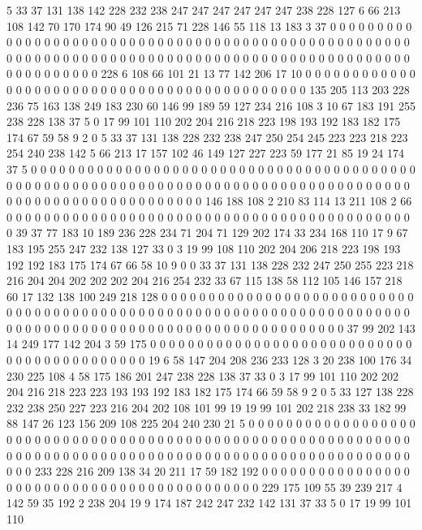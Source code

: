 5 33 37 131 138 142 228 232 238 247 247 247 247 247 247 238 228 127 6 66
213 108 142 70 170 174 90 49 126 215 71 228 146 55 118 13 183 3 37 0
0 0 0 0 0 0 0 0 0 0 0 0 0 0 0 0 0 0 0 0
0 0 0 0 0 0 0 0 0 0 0 0 0 0 0 0 0 0 0 0
0 0 0 0 0 0 0 0 0 0 0 0 0 0 0 0 0 0 0 0
0 0 0 0 0 0 0 0 0 0 0 0 0 0 0 0 0 0 0 0
0 0 0 0 0 0 0 0 0 0 0 0 0 0 0 0 0 0 0 0
0 0 0 0 228 6 108 66 101 21 13 77 142 206 17 10 0 0 0 0
0 0 0 0 0 0 0 0 0 0 0 0 0 0 0 0 0 0 0 0
0 0 0 0 0 0 0 0 0 0 0 0 0 0 0 0 0 0 0 0
135 205 113 203 228 236 75 163 138 249 183 230 60 146 99 189 59 127 234 216
108 3 10 67 183 191 255 238 228 138 37 5 0 17 99 101 110 202 204 216
218 223 198 193 192 183 182 175 174 67 59 58 9 2 0 5 33 37 131 138
228 232 238 247 250 254 245 223 223 218 223 254 240 238 142 5 66 213 17 157
102 46 149 127 227 223 59 177 21 85 19 24 174 37 5 0 0 0 0 0
0 0 0 0 0 0 0 0 0 0 0 0 0 0 0 0 0 0 0 0
0 0 0 0 0 0 0 0 0 0 0 0 0 0 0 0 0 0 0 0
0 0 0 0 0 0 0 0 0 0 0 0 0 0 0 0 0 0 0 0
0 0 0 0 0 0 0 0 0 0 0 0 0 0 0 0 0 0 0 0
0 0 0 0 0 0 0 0 0 0 0 0 0 0 0 0 0 0 0 0
146 188 108 2 210 83 114 13 211 108 2 66 0 0 0 0 0 0 0 0
0 0 0 0 0 0 0 0 0 0 0 0 0 0 0 0 0 0 0 0
0 0 0 0 0 0 0 0 0 0 0 0 0 0 0 0 39 37 77 183
10 189 236 228 234 71 204 71 129 202 174 33 234 168 110 17 9 67 183 195
255 247 232 138 127 33 0 3 19 99 108 110 202 204 206 218 223 198 193 192
192 183 175 174 67 66 58 10 9 0 0 33 37 131 138 228 232 247 250 255
223 218 216 204 204 202 202 202 204 216 254 232 33 67 115 138 58 112 105 146
157 218 60 17 132 138 100 249 218 128 0 0 0 0 0 0 0 0 0 0
0 0 0 0 0 0 0 0 0 0 0 0 0 0 0 0 0 0 0 0
0 0 0 0 0 0 0 0 0 0 0 0 0 0 0 0 0 0 0 0
0 0 0 0 0 0 0 0 0 0 0 0 0 0 0 0 0 0 0 0
0 0 0 0 0 0 0 0 0 0 0 0 0 0 0 0 0 0 0 0
0 0 0 0 0 0 0 0 0 0 0 0 0 0 0 0 37 99 202 143
14 249 177 142 204 3 59 175 0 0 0 0 0 0 0 0 0 0 0 0
0 0 0 0 0 0 0 0 0 0 0 0 0 0 0 0 0 0 0 0
0 0 0 0 0 0 0 0 0 0 0 19 6 58 147 204 208 236 233 128
3 20 238 100 176 34 230 225 108 4 58 175 186 201 247 238 228 138 37 33
0 3 17 99 101 110 202 202 204 216 218 223 223 193 193 192 183 182 175 174
66 59 58 9 2 0 5 33 127 138 228 232 238 250 227 223 216 204 202 108
101 99 19 19 99 101 202 218 238 33 182 99 88 147 26 123 156 209 108 225
204 240 230 21 5 0 0 0 0 0 0 0 0 0 0 0 0 0 0 0
0 0 0 0 0 0 0 0 0 0 0 0 0 0 0 0 0 0 0 0
0 0 0 0 0 0 0 0 0 0 0 0 0 0 0 0 0 0 0 0
0 0 0 0 0 0 0 0 0 0 0 0 0 0 0 0 0 0 0 0
0 0 0 0 0 0 0 0 0 0 0 0 0 0 0 0 0 0 0 0
0 0 0 0 0 0 0 0 0 0 0 0 233 228 216 209 138 34 20 211
17 59 182 192 0 0 0 0 0 0 0 0 0 0 0 0 0 0 0 0
0 0 0 0 0 0 0 0 0 0 0 0 0 0 0 0 0 0 0 0
0 0 0 0 0 0 0 229 175 109 55 39 239 217 4 142 59 35 192 2
238 204 19 9 174 187 242 247 232 142 131 37 33 5 0 17 19 99 101 110

